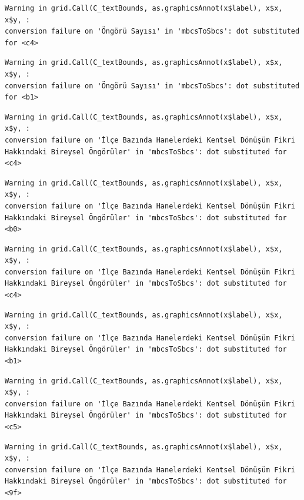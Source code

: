 \documentclass[
  11pt,
  a4paper,
  DIV=11,
  numbers=noendperiod]{scrartcl}
\begin{document}
\begin{verbatim}
Warning in grid.Call(C_textBounds, as.graphicsAnnot(x$label), x$x, x$y, :
conversion failure on 'Öngörü Sayısı' in 'mbcsToSbcs': dot substituted for <c4>
\end{verbatim}

\begin{verbatim}
Warning in grid.Call(C_textBounds, as.graphicsAnnot(x$label), x$x, x$y, :
conversion failure on 'Öngörü Sayısı' in 'mbcsToSbcs': dot substituted for <b1>
\end{verbatim}

\begin{verbatim}
Warning in grid.Call(C_textBounds, as.graphicsAnnot(x$label), x$x, x$y, :
conversion failure on 'İlçe Bazında Hanelerdeki Kentsel Dönüşüm Fikri
Hakkındaki Bireysel Öngörüler' in 'mbcsToSbcs': dot substituted for <c4>
\end{verbatim}

\begin{verbatim}
Warning in grid.Call(C_textBounds, as.graphicsAnnot(x$label), x$x, x$y, :
conversion failure on 'İlçe Bazında Hanelerdeki Kentsel Dönüşüm Fikri
Hakkındaki Bireysel Öngörüler' in 'mbcsToSbcs': dot substituted for <b0>
\end{verbatim}

\begin{verbatim}
Warning in grid.Call(C_textBounds, as.graphicsAnnot(x$label), x$x, x$y, :
conversion failure on 'İlçe Bazında Hanelerdeki Kentsel Dönüşüm Fikri
Hakkındaki Bireysel Öngörüler' in 'mbcsToSbcs': dot substituted for <c4>
\end{verbatim}

\begin{verbatim}
Warning in grid.Call(C_textBounds, as.graphicsAnnot(x$label), x$x, x$y, :
conversion failure on 'İlçe Bazında Hanelerdeki Kentsel Dönüşüm Fikri
Hakkındaki Bireysel Öngörüler' in 'mbcsToSbcs': dot substituted for <b1>
\end{verbatim}

\begin{verbatim}
Warning in grid.Call(C_textBounds, as.graphicsAnnot(x$label), x$x, x$y, :
conversion failure on 'İlçe Bazında Hanelerdeki Kentsel Dönüşüm Fikri
Hakkındaki Bireysel Öngörüler' in 'mbcsToSbcs': dot substituted for <c5>
\end{verbatim}

\begin{verbatim}
Warning in grid.Call(C_textBounds, as.graphicsAnnot(x$label), x$x, x$y, :
conversion failure on 'İlçe Bazında Hanelerdeki Kentsel Dönüşüm Fikri
Hakkındaki Bireysel Öngörüler' in 'mbcsToSbcs': dot substituted for <9f>
\end{verbatim}
\end{document}
